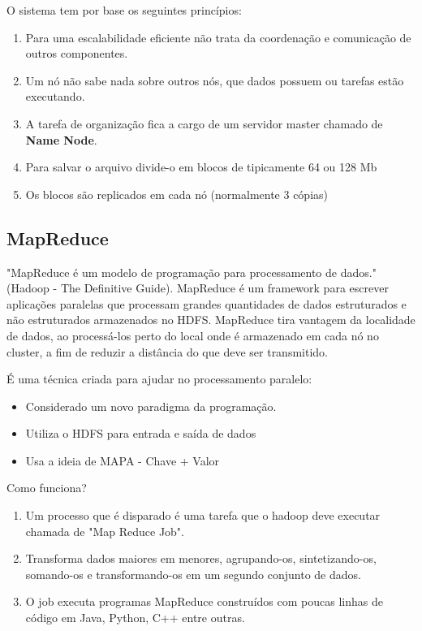 \documentclass[a4paper,11pt]{article}
\begin{document}
O sistema tem por base os seguintes princípios:

\begin{enumerate} \vspace{-1em}
	\item Para uma escalabilidade eficiente não trata da coordenação e comunicação de outros componentes.
	\item Um nó não sabe nada sobre outros nós, que dados possuem ou tarefas estão executando.
	\item A tarefa de organização fica a cargo de um servidor master chamado de \textbf{Name Node}.
	\item Para salvar o arquivo divide-o em blocos de tipicamente 64 ou 128 Mb
\item Os blocos são replicados em cada nó (normalmente 3 cópias)
\end{enumerate}

\subsection{MapReduce}
"MapReduce é um modelo de programação para processamento de dados." (Hadoop - The Definitive Guide). MapReduce é um framework para escrever aplicações paralelas que processam grandes quantidades de dados estruturados e não estruturados armazenados no HDFS. MapReduce tira vantagem da localidade de dados, ao processá-los perto do local onde é armazenado em cada nó no cluster, a fim de reduzir a distância do que deve ser transmitido.

É uma técnica criada para ajudar no processamento paralelo: \vspace{-1em}
\begin{itemize}
	\item Considerado um novo paradigma da programação.
	\item Utiliza o HDFS para entrada e saída de dados
	\item Usa a ideia de MAPA - Chave + Valor
\end{itemize}

Como funciona? \vspace{-1em}
\begin{enumerate}
	\item Um processo que é disparado é uma tarefa que o hadoop deve executar chamada de "Map Reduce Job".
	\item Transforma dados maiores em menores, agrupando-os, sintetizando-os, somando-os e transformando-os em um segundo conjunto de dados.
	\item O job executa programas MapReduce construídos com poucas linhas de código em Java, Python, C++ entre outras.
\end{enumerate}
\end{document}
